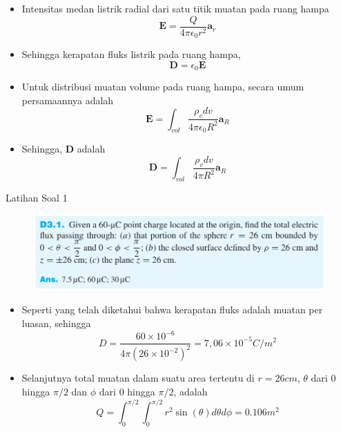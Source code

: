 \documentclass[10pt]{beamer}
\begin{document}
\begin{frame}
    \begin{itemize}
        \item Intensitas medan listrik radial dari satu titik muatan pada ruang hampa
        $$ \textbf{E} = \frac{Q}{4 \pi \epsilon_0 r^2 }\textbf{a}_r$$
        \item Sehingga kerapatan fluks listrik pada \alert{ruang hampa},
        \begin{equation}
            \textbf{D} = \epsilon_0 \textbf{E}
        \end{equation}
        \item Untuk distribusi muatan volume pada ruang hampa, secara umum persamaannya adalah
        \begin{equation}
            \textbf{E} = \int_{vol} \frac{\rho_v dv}{4 \pi \epsilon_0 R^2}\textbf{a}_R
        \end{equation}
        \item Sehingga, $\textbf{D}$ adalah
        \begin{equation}
            \textbf{D} = \int_{vol} \frac{\rho_v dv}{4 \pi R^2}\textbf{a}_R
        \end{equation}
    \end{itemize}
\end{frame}

\begin{frame}{Latihan Soal 1}
    \begin{figure}
        \includegraphics[width=\linewidth]{chap03/latihansoal1.png}
    \end{figure}

    \begin{itemize}
        \item Seperti yang telah diketahui bahwa kerapatan fluks adalah muatan per luasan, sehingga
        \begin{equation*}
            D = \frac{60 \times 10^{-6}}{4 \pi (26 \times 10^{-2})^2} = 7,06 \times 10^{-5} C/m^2
        \end{equation*}
        \item Selanjutnya total muatan dalam suatu area tertentu di $r = 26 cm$, $\theta$ dari $0$ hingga $\pi / 2$ dan $\phi$ dari $0$ hingga $\pi /2 $, adalah
        \begin{equation*}
            Q = \int_0^{\pi / 2} \int_0^{\pi / 2} r^2 \sin(\theta) d\theta d\phi = 0.106 m^2
        \end{equation*}
    \end{itemize}
\end{frame}
\end{document}
